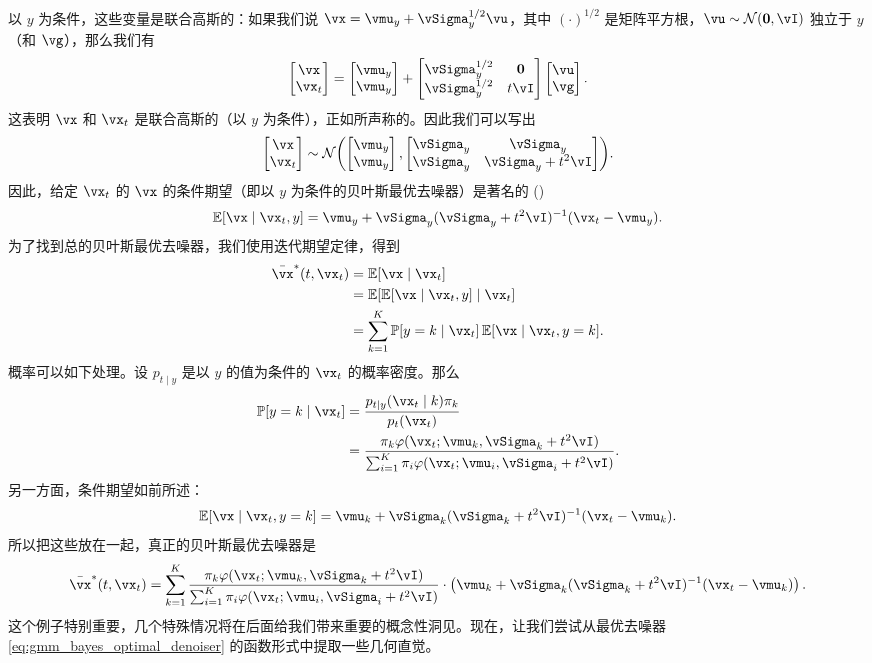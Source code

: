 \documentclass[../../book-main.tex]{subfiles}
\begin{document}
\begin{example}[从高斯混合模型中去噪高斯噪声]
	以 \(y\) 为条件，这些变量是联合高斯的：如果我们说 \(\vx = \vmu_{y} + \vSigma_{y}^{1/2}\vu\)，其中 \((\cdot)^{1/2}\) 是矩阵平方根，\(\vu \sim \dNorm(\vzero, \vI)\) 独立于 \(y\)（和 \(\vg\)），那么我们有
	\begin{equation}
		\mat{\vx \\ \vx_{t}} = \mat{\vmu_{y} \\ \vmu_{y}} + \mat{\vSigma_{y}^{1/2} & \vzero \\ \vSigma_{y}^{1/2} & t\vI}\mat{\vu \\ \vg}.
	\end{equation}
	这表明 \(\vx\) 和 \(\vx_{t}\) 是联合高斯的（以 \(y\) 为条件），正如所声称的。因此我们可以写出
	\begin{equation}
		\mat{\vx \\ \vx_{t}} \sim \dNorm\rp{\mat{\vmu_{y} \\ \vmu_{y}}, \mat{\vSigma_{y} & \vSigma_{y} \\ \vSigma_{y} & \vSigma_{y} + t^{2}\vI}}.
	\end{equation}
	因此，给定 \(\vx_{t}\) 的 \(\vx\) 的条件期望（即以 \(y\) 为条件的贝叶斯最优去噪器）是著名的
	()
	\begin{equation}
		\Ex[\vx \mid \vx_{t}, y] = \vmu_{y} + \vSigma_{y}(\vSigma_{y} + t^{2}\vI)^{-1}(\vx_{t} - \vmu_{y}).
	\end{equation}
	为了找到总的贝叶斯最优去噪器，我们使用迭代期望定律，得到
	\begin{align}
		\bar{\vx}^{\ast}(t, \vx_{t})
		&= \Ex[\vx \mid \vx_{t}] \\ 
		&= \Ex[\Ex[\vx \mid \vx_{t}, y] \mid \vx_{t}] \\ 
		&= \sum_{k = 1}^{K}\Pr[y = k \mid \vx_{t}]\Ex[\vx \mid \vx_{t}, y = k].
	\end{align}
	概率可以如下处理。设 \(p_{t \mid y}\) 是以 \(y\) 的值为条件的 \(\vx_{t}\) 的概率密度。那么
	\begin{align}
		\Pr[y = k \mid \vx_{t}]
		&= \frac{p_{t \mid y}(\vx_{t} \mid k)\pi_{k}}{p_{t}(\vx_{t})} \\ 
		&= \frac{\pi_{k}\phi(\vx_{t} ; \vmu_{k}, \vSigma_{k}
		+ t^{2}\vI)}{\sum_{i = 1}^{K}\pi_{i}\phi(\vx_{t} ; \vmu_{i}, \vSigma_{i} + t^{2}\vI)}.
	\end{align}
	另一方面，条件期望如前所述：
	\begin{equation}
		\Ex[\vx \mid \vx_{t}, y = k] = \vmu_{k} + \vSigma_{k}(\vSigma_{k} + t^{2}\vI)^{-1}(\vx_{t} - \vmu_{k}).
	\end{equation}
	所以把这些放在一起，真正的贝叶斯最优去噪器是
	\begin{equation}\label{eq:gmm_bayes_optimal_denoiser}
		\bar{\vx}^{\ast}(t, \vx_{t}) = \sum_{k = 1}^{K}\frac{\pi_{k}\phi(\vx_{t}
		;\vmu_{k}, \vSigma_{k} + t^{2}\vI)}{\sum_{i = 1}^{K}\pi_{i}\phi(\vx_{t}
		;\vmu_{i}, \vSigma_{i} + t^{2}\vI)}\cdot\bp{\vmu_{k} + \vSigma_{k}(\vSigma_{k} + t^{2}\vI)^{-1}(\vx_{t} - \vmu_{k})}.
	\end{equation}
	这个例子特别重要，几个特殊情况将在后面给我们带来重要的概念性洞见。现在，让我们尝试从最优去噪器 \eqref{eq:gmm_bayes_optimal_denoiser} 的函数形式中提取一些几何直觉。


\end{example}
\end{document}
